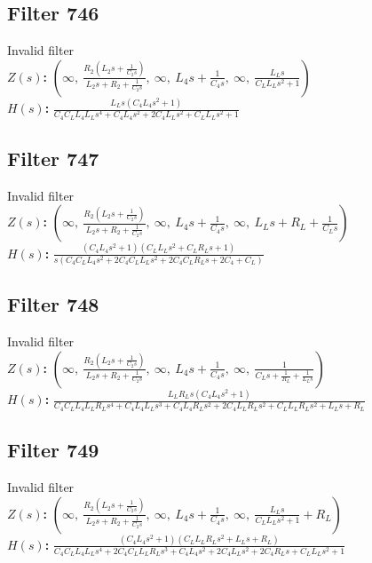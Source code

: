 \documentclass{article}
\begin{document}
\subsection*{Filter 746}
Invalid filter \\ 
\textbf{$Z(s)$:} $\left( \infty, \  \frac{R_{2} \left(L_{2} s + \frac{1}{C_{2} s}\right)}{L_{2} s + R_{2} + \frac{1}{C_{2} s}}, \  \infty, \  L_{4} s + \frac{1}{C_{4} s}, \  \infty, \  \frac{L_{L} s}{C_{L} L_{L} s^{2} + 1}\right)$ \\ 
\textbf{$H(s)$:} $\frac{L_{L} s \left(C_{4} L_{4} s^{2} + 1\right)}{C_{4} C_{L} L_{4} L_{L} s^{4} + C_{4} L_{4} s^{2} + 2 C_{4} L_{L} s^{2} + C_{L} L_{L} s^{2} + 1}$ \\ 
\subsection*{Filter 747}
Invalid filter \\ 
\textbf{$Z(s)$:} $\left( \infty, \  \frac{R_{2} \left(L_{2} s + \frac{1}{C_{2} s}\right)}{L_{2} s + R_{2} + \frac{1}{C_{2} s}}, \  \infty, \  L_{4} s + \frac{1}{C_{4} s}, \  \infty, \  L_{L} s + R_{L} + \frac{1}{C_{L} s}\right)$ \\ 
\textbf{$H(s)$:} $\frac{\left(C_{4} L_{4} s^{2} + 1\right) \left(C_{L} L_{L} s^{2} + C_{L} R_{L} s + 1\right)}{s \left(C_{4} C_{L} L_{4} s^{2} + 2 C_{4} C_{L} L_{L} s^{2} + 2 C_{4} C_{L} R_{L} s + 2 C_{4} + C_{L}\right)}$ \\ 
\subsection*{Filter 748}
Invalid filter \\ 
\textbf{$Z(s)$:} $\left( \infty, \  \frac{R_{2} \left(L_{2} s + \frac{1}{C_{2} s}\right)}{L_{2} s + R_{2} + \frac{1}{C_{2} s}}, \  \infty, \  L_{4} s + \frac{1}{C_{4} s}, \  \infty, \  \frac{1}{C_{L} s + \frac{1}{R_{L}} + \frac{1}{L_{L} s}}\right)$ \\ 
\textbf{$H(s)$:} $\frac{L_{L} R_{L} s \left(C_{4} L_{4} s^{2} + 1\right)}{C_{4} C_{L} L_{4} L_{L} R_{L} s^{4} + C_{4} L_{4} L_{L} s^{3} + C_{4} L_{4} R_{L} s^{2} + 2 C_{4} L_{L} R_{L} s^{2} + C_{L} L_{L} R_{L} s^{2} + L_{L} s + R_{L}}$ \\ 
\subsection*{Filter 749}
Invalid filter \\ 
\textbf{$Z(s)$:} $\left( \infty, \  \frac{R_{2} \left(L_{2} s + \frac{1}{C_{2} s}\right)}{L_{2} s + R_{2} + \frac{1}{C_{2} s}}, \  \infty, \  L_{4} s + \frac{1}{C_{4} s}, \  \infty, \  \frac{L_{L} s}{C_{L} L_{L} s^{2} + 1} + R_{L}\right)$ \\ 
\textbf{$H(s)$:} $\frac{\left(C_{4} L_{4} s^{2} + 1\right) \left(C_{L} L_{L} R_{L} s^{2} + L_{L} s + R_{L}\right)}{C_{4} C_{L} L_{4} L_{L} s^{4} + 2 C_{4} C_{L} L_{L} R_{L} s^{3} + C_{4} L_{4} s^{2} + 2 C_{4} L_{L} s^{2} + 2 C_{4} R_{L} s + C_{L} L_{L} s^{2} + 1}$ \\ 
\end{document}
